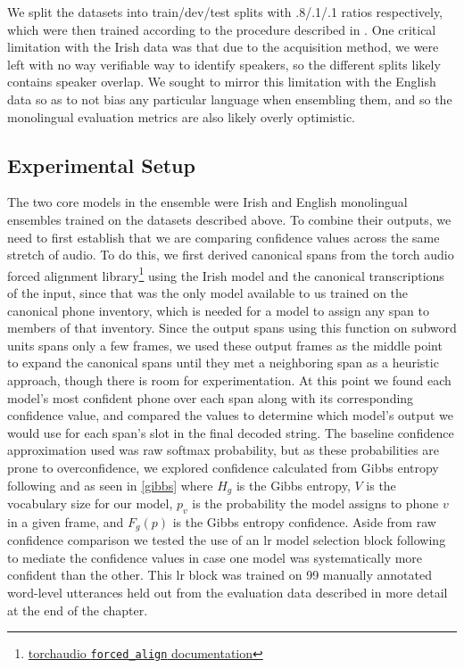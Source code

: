 \documentclass[thesis]{cluu}
\begin{document}
We split the datasets into train/dev/test splits with .8/.1/.1 ratios respectively, which were then trained according to the procedure described in . One critical limitation with the Irish data was that due to the acquisition method, we were left with no way verifiable way to identify speakers, so the different splits likely contains speaker overlap. We sought to mirror this limitation with the English data so as to not bias any particular language when ensembling them, and so the monolingual evaluation metrics are also likely overly optimistic.

\subsection{Experimental Setup}
 
The two core models in the ensemble were Irish and English monolingual ensembles trained on the datasets described above. To combine their outputs, we need to first establish that we are comparing confidence values across the same stretch of audio. To do this, we first derived canonical spans from the torch audio forced alignment library\footnote{\href{https://docs.pytorch.org/audio/main/generated/torchaudio.functional.forced_align.html}{torchaudio \texttt{forced\_align} documentation}} using the Irish model and the canonical transcriptions of the input, since that was the only model available to us trained on the canonical phone inventory, which is needed for a model to assign any span to members of that inventory. Since the output spans using this function on subword units spans only a few frames, we used these output frames as the middle point to expand the canonical spans until they met a neighboring span as a heuristic approach, though there is room for experimentation. At this point we found each model's most confident phone over each span along with its corresponding confidence value, and compared the values to determine which model's output we would use for each span's slot in the final decoded string. The baseline confidence approximation used was raw softmax probability, but as these probabilities are prone to overconfidence, we explored confidence calculated from Gibbs entropy following \textcite{laptevFastEntropyBasedMethods2023} and \textcite{gitmanConfidencebasedEnsemblesEndtoEnd2023} as seen in \cref{gibbs} where $H_g$ is the Gibbs entropy, $V$ is the vocabulary size for our model, $p_v$ is the probability the model assigns to phone $v$ in a given frame, and $F_g(p)$ is the Gibbs entropy confidence. Aside from raw confidence comparison we tested the use of an \gls{lr} model selection block following \textcite{gitmanConfidencebasedEnsemblesEndtoEnd2023} to mediate the confidence values in case one model was systematically more confident than the other. This \gls{lr} block was trained on 99 manually annotated word-level utterances held out from the evaluation data described in more detail at the end of the chapter.
\end{document}
